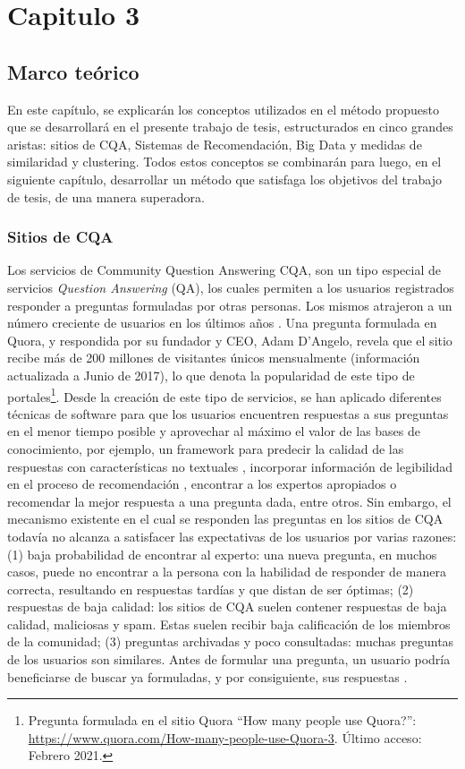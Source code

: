 \chapter*{Capitulo 3}\label{ch:plan}
\section{Marco teórico}
\noindent En este capítulo, se explicarán los conceptos utilizados en el método propuesto que se desarrollará en el presente trabajo de tesis, estructurados en cinco grandes aristas: sitios de CQA, Sistemas de Recomendación, Big Data y medidas de similaridad y clustering. Todos estos conceptos se combinarán para luego, en el siguiente capítulo, desarrollar un método que satisfaga los objetivos del trabajo de tesis, de una manera superadora.

\subsection{Sitios de CQA}
Los servicios de Community Question Answering CQA, son un tipo especial de servicios \textit{Question Answering} (QA), los cuales permiten a los usuarios registrados responder a preguntas formuladas por otras personas. Los mismos atrajeron a un número creciente de usuarios en los últimos años \citep{li2010routing}. Una pregunta formulada en Quora, y respondida por su fundador y CEO, Adam D'Angelo, revela que el sitio recibe más de 200 millones de visitantes únicos mensualmente (información actualizada a Junio de 2017), lo que denota la popularidad de este tipo de portales\footnote{Pregunta formulada en el sitio Quora “How many people use Quora?”: \url{https://www.quora.com/How-many-people-use-Quora-3}. Último acceso: Febrero 2021.}. Desde la creación de este tipo de servicios, se han aplicado diferentes técnicas de software para que los usuarios encuentren respuestas a sus preguntas en el menor tiempo posible y aprovechar al máximo el valor de las bases de conocimiento, por ejemplo, un framework para predecir la calidad de las respuestas con características no textuales \citep{jeon2006framework}, incorporar información de legibilidad en el proceso de recomendación \citep{anuyah2017can}, encontrar a los expertos apropiados \citep{li2010routing} o recomendar la mejor respuesta a una pregunta dada, entre otros. Sin embargo, el mecanismo existente en el cual se responden las preguntas en los sitios de CQA todavía no alcanza a satisfacer las expectativas de los usuarios por varias razones: (1) baja probabilidad de encontrar al experto: una nueva pregunta, en muchos casos, puede no encontrar a la persona con la habilidad de responder de manera correcta, resultando en respuestas tardías y que distan de ser óptimas; (2) respuestas de baja calidad: los sitios de CQA suelen contener respuestas de baja calidad, maliciosas y spam. Estas suelen recibir baja calificación de los miembros de la comunidad; (3) preguntas archivadas y poco consultadas: muchas preguntas de los usuarios son similares. Antes de formular una pregunta, un usuario podría beneficiarse de buscar ya formuladas, y por consiguiente, sus respuestas \citep{yang2013cqarank}.

